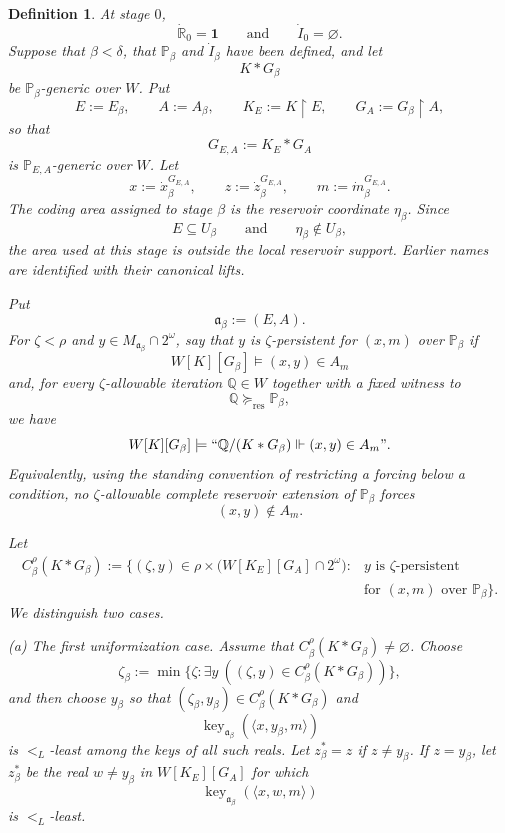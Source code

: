 \documentclass[a4paper,11pt]{article}
\newtheorem{definition}[theorem]{Definition}
\newcommand{\forceP}{\mathbb{P}}
\newcommand{\forceQ}{\mathbb{Q}}
\newcommand{\forceR}{\mathbb{R}}
\newcommand{\key}{\operatorname{key}}
\begin{document}
\begin{definition}
At stage $0$,
\[
   \dot{\forceR}_0=\mathbf 1
   \qquad\text{and}\qquad
   \dot I_0=\varnothing.
\]
Suppose that $\beta<\delta$, that $\forceP_\beta$ and $\dot I_\beta$ have been defined, and let
\[
   K*G_\beta
\]
be $\forceP_\beta$-generic over $W$.  Put
\[
   E:=E_\beta,
   \qquad
   A:=A_\beta,
   \qquad
   K_E:=K\upharpoonright E,
   \qquad
   G_A:=G_\beta\upharpoonright A,
\]
so that
\[
   G_{E,A}:=K_E*G_A
\]
is $\forceP_{E,A}$-generic over $W$.  Let
\[
   x:=\dot x_\beta^{G_{E,A}},\qquad
   z:=\dot z_\beta^{G_{E,A}},\qquad
   m:=\dot m_\beta^{G_{E,A}}.
\]
The coding area assigned to stage $\beta$ is the reservoir coordinate
$\eta_\beta$.  Since
\[
   E\subseteq U_\beta
   \qquad\text{and}\qquad
   \eta_\beta\notin U_\beta,
\]
the area used at this stage is outside the local reservoir support.
Earlier names are identified with their canonical lifts.

Put
\[
   \mathfrak a_\beta:=(E,A).
\]
For $\zeta<\rho$ and $y\in M_{\mathfrak a_\beta}\cap2^\omega$, say that $y$ is \emph{$\zeta$-persistent for $(x,m)$ over $\forceP_\beta$} if
\[
   W[K][G_\beta]\models (x,y)\in A_m
\]
and, for every $\zeta$-allowable iteration $\forceQ\in W$ together with a fixed witness to
\[
   \forceQ\succeq_{\mathrm{res}}\forceP_\beta,
\]
we have
\[
   W[K][G_\beta]\models
   ``\forceQ/(K*G_\beta)\Vdash(x,y)\in A_m".
\]
Equivalently, using the standing convention of restricting a forcing below a condition, no $\zeta$-allowable complete reservoir extension of $\forceP_\beta$ forces
\[
   (x,y)\notin A_m.
\]

Let
\[
\begin{aligned}
   C_\beta^\rho(K*G_\beta)
   :=\bigl\{(\zeta,y)\in
      \rho\times\bigl(W[K_E][G_A]\cap2^\omega\bigr):{}&
      y\text{ is }\zeta\text{-persistent}\\
      &\text{for }(x,m)\text{ over }\forceP_\beta
   \bigr\}.
\end{aligned}
\]
We distinguish two cases.

\medskip
\noindent
\textup{(a) The first uniformization case.}
Assume that $C_\beta^\rho(K*G_\beta)\neq\varnothing$.  Choose
\[
   \zeta_\beta
   :=\min\{\zeta:\exists y\ ((\zeta,y)\in C_\beta^\rho(K*G_\beta))\},
\]
and then choose $y_\beta$ so that $(\zeta_\beta,y_\beta)\in C_\beta^\rho(K*G_\beta)$ and
\[
   \key_{\mathfrak a_\beta}(\langle x,y_\beta,m\rangle)
\]
is $<_L$-least among the keys of all such reals.  Let $z_\beta^*=z$ if
$z\neq y_\beta$.  If $z=y_\beta$, let $z_\beta^*$ be the real
$w\neq y_\beta$ in $W[K_E][G_A]$ for which
\[
   \key_{\mathfrak a_\beta}(\langle x,w,m\rangle)
\]
is $<_L$-least. 


\end{definition}
\end{document}
